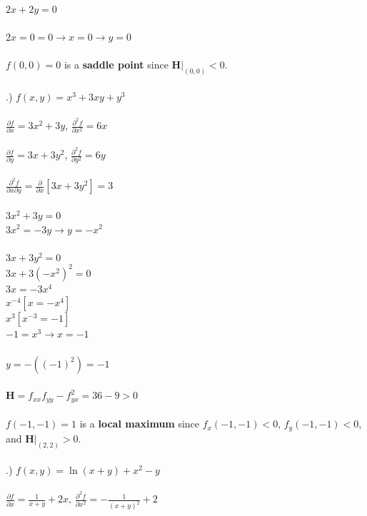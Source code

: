 \documentclass[12pt]{article}
\begin{document}
\noindent $2x+2y = 0$\\\\
\noindent $2x=0= 0 \rightarrow x = 0 \rightarrow y = 0$\\\\
\noindent $f(0, 0) = 0$ is a \textbf{saddle point} since $\mathbf{H}\Big|_{(0,0)} < 0$.\\\\
.) $f(x,y) = x^{3}+3xy + y^{3}$\\\\
\noindent $\frac{\partial f}{\partial x} = 3x^{2} + 3y$, \hspace{10pt} $\frac{\partial ^{2} f}{\partial x^{2}} = 6x$\\\\
\noindent $\frac{\partial f}{\partial y} = 3x + 3y^{2}$, \hspace{10pt} $\frac{\partial ^{2} f}{\partial y^{2}} = 6y$\\\\
\noindent $\frac{\partial^{2} f}{\partial x \partial y } = \frac{\partial }{\partial x}[3x + 3y^{2}] = 3$\\\\
\noindent $3x^{2} + 3y = 0 $\\
\noindent $3x^{2} = -3y \rightarrow y = -x^{2}$\\\\
\noindent $3x + 3y^{2} = 0$\\
\noindent $3x + 3(-x^{2})^{2} = 0$\\
\noindent $3x = -3x^{4}$\\
\noindent $x^{-4}[x = -x^{4}]$\\
\noindent $x^{3}[x^{-3} = -1]$\\
\noindent $-1 = x^{3} \rightarrow x = -1$\\\\
\noindent $y = -((-1)^{2}) = -1$\\\\
\noindent $\mathbf{H} = f_{xx}f_{yy} - f_{yx}^{2} = 36 - 9 > 0$\\\\
\noindent $f(-1, -1) = 1$ is a \textbf{local maximum} since $f_{x}(-1, -1) < 0$, $f_{y}(-1, -1) < 0$, and $\mathbf{H}\Big|_{(2,2)} > 0$.\\\\
.) $f(x, y) = \ln(x + y) + x^{2}-y$\\\\
\noindent $\frac{\partial f}{\partial x} = \frac{1}{x+y} + 2x$, \hspace{10pt} $\frac{\partial ^{2} f}{\partial x^{2}} = -\frac{1}{(x + y)^{2}} + 2$\\\\
\end{document}
